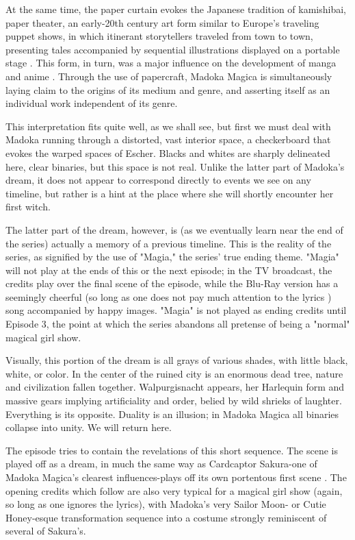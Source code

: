 At the same time, the paper curtain evokes the Japanese tradition of kamishibai, paper theater, an early-20th century art form similar to Europe's traveling puppet shows, in which itinerant storytellers traveled from town to town, presenting tales accompanied by sequential illustrations displayed on a portable stage \cite{ref13}. This form, in turn, was a major influence on the development of manga and anime \cite{ref14}. Through the use of papercraft, Madoka Magica is simultaneously laying claim to the origins of its medium and genre, and asserting itself as an individual work independent of its genre.

This interpretation fits quite well, as we shall see, but first we must deal with Madoka running through a distorted, vast interior space, a checkerboard that evokes the warped spaces of Escher. Blacks and whites are sharply delineated here, clear binaries, but this space is not real. Unlike the latter part of Madoka's dream, it does not appear to correspond directly to events we see on any timeline, but rather is a hint at the place where she will shortly encounter her first witch.

The latter part of the dream, however, is (as we eventually learn near the end of the series) actually a memory of a previous timeline. This is the reality of the series, as signified by the use of "Magia," the series' true ending theme. "Magia" will not play at the ends of this or the next episode; in the TV broadcast, the credits play over the final scene of the episode, while the Blu-Ray version has a seemingly cheerful (so long as one does not pay much attention to the lyrics ) song accompanied by happy images. "Magia" is not played as ending credits until Episode 3, the point at which the series abandons all pretense of being a "normal" magical girl show.

Visually, this portion of the dream is all grays of various shades, with little black, white, or color. In the center of the ruined city is an enormous dead tree, nature and civilization fallen together. Walpurgisnacht appears, her Harlequin form and massive gears implying artificiality and order, belied by wild shrieks of laughter. Everything is its opposite. Duality is an illusion; in Madoka Magica all binaries collapse into unity. We will return here.

The episode tries to contain the revelations of this short sequence. The scene is played off as a dream, in much the same way as Cardcaptor Sakura-one of Madoka Magica's clearest influences-plays off its own portentous first scene \cite{ref15}. The opening credits which follow are also very typical for a magical girl show (again, so long as one ignores the lyrics), with Madoka's very Sailor Moon- \cite{ref16} or Cutie Honey-esque \cite{ref17} transformation sequence into a costume strongly reminiscent of several of Sakura's.

